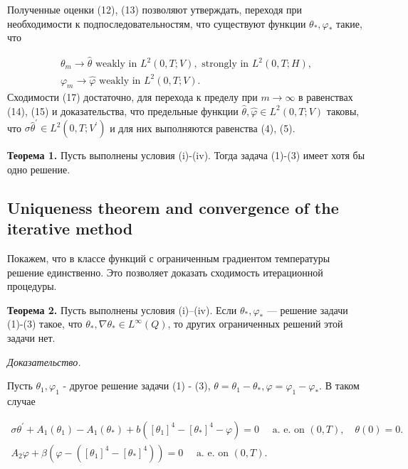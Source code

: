Полученные оценки (12), (13) позволяют утверждать, переходя при необходимости к подпоследовательностям,
что существуют функции $\theta_{*}, \varphi_{*}$ такие, что

$$
\begin{aligned}
    \theta_{m} \rightarrow \widehat{\theta} \text { weakly in } L^{2}(0, T ; V), \text { strongly in } L^{2}(0, T ; H), \\
    \varphi_{m} \rightarrow \widehat{\varphi} \text { weakly in } L^{2}(0, T ; V) .
\end{aligned}
$$
Сходимости (17) достаточно, для перехода к пределу при $m \rightarrow \infty$
в равенствах (14), (15) и доказательства,
что предельные функции $\widehat{\theta}, \widehat{\varphi } \in L^{2}(0, T ; V)$ таковы,
что $\sigma \widehat{\theta}^{\prime} \in L^{2}\left(0, T ; V^{ \prime}\right)$
и для них выполняются равенства (4), (5).


\textbf{Теорема 1.}
Пусть выполнены условия (i)-(iv).
Тогда задача (1)-(3) имеет хотя бы одно решение.

\subsection{Uniqueness theorem and convergence of the iterative method}\label{subsec:ch3:sec1:subsec4}
Покажем, что в классе функций с ограниченным градиентом температуры решение единственно.
Это позволяет доказать сходимость итерационной процедуры.

\textbf{Теорема 2.}
Пусть выполнены условия (i)–(iv).
Если $\theta_{*}, \varphi_{*}$ — решение задачи (1)-(3) такое,
что $\theta_{*}, \nabla \theta_{*} \in L^{\infty }(Q)$, то других ограниченных решений этой задачи нет.

\textit{Доказательство.}

Пусть $\theta_{1}, \varphi_{1}$ - другое решение задачи (1) - (3),
$\theta=\theta_{1}-\theta_{*}, \varphi=\varphi_{ 1}-\varphi_{*}$.
В таком случае

$$
\begin{gathered}
    \sigma \theta^{\prime}+A_{1}\left(\theta_{1}\right)
    -A_{1}\left(\theta_{*}\right)+b\left(\left[\theta_{1}\right]^{4}-
    \left[\theta_{*}\right]^{4}-\varphi\right)=0 \quad \text { a. e. on }(0, T), \quad \theta(0)=0 . \\
    A_{2} \varphi+\beta\left(\varphi-\left(\left[\theta_{1}\right]^{4}
    -\left[\theta_{*}\right]^{4}\right)\right)=0 \quad \text { a. e. on }(0, T).
\end{gathered}
$$


